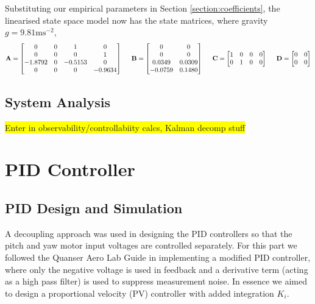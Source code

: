 \documentclass[11pt]{article}
\begin{document}
Substituting our empirical parameters in Section \ref{section:coefficients}, the linearised state space model now has the state matrices, where gravity $g = 9.81\text{ms}^{-2}$,
\begin{align*}
\mathbf{A} = \begin{bmatrix}
    0 & 0 & 1 & 0\\
    0 & 0 & 0 & 1\\
    -1.8792 & 0 & -0.5153 & 0\\
    0 & 0 & 0 & -0.9634
    \end{bmatrix} \hspace{.5cm}
\mathbf{B} = \begin{bmatrix}
    0 & 0\\
    0 & 0\\
    0.0349 & 0.0309\\
    -0.0759 & 0.1480
    \end{bmatrix} \hspace{.5cm}
\mathbf{C} = \begin{bmatrix}
    1 & 0 & 0 & 0\\
    0 & 1 & 0 & 0
    \end{bmatrix} \hspace{.5cm}
\mathbf{D} = \begin{bmatrix}
    0 & 0\\
    0 & 0
\end{bmatrix}
\end{align*}

\subsection{System Analysis}
\colorbox{yellow}{Enter in observability/controllabiity calcs, Kalman decomp stuff}

\newpage
\section{PID Controller} %

\subsection{PID Design and Simulation}
A decoupling approach was used in designing the PID controllers so that the pitch and yaw motor input voltages are controlled separately. For this part we followed the Quanser Aero Lab Guide in implementing a modified PID controller, where only the negative voltage is used in feedback and a derivative term (acting as a high pass filter) is used to suppress measurement noise. In essence we aimed to design a proportional velocity (PV) controller with added integration $K_i$.\\ 
\end{document}
